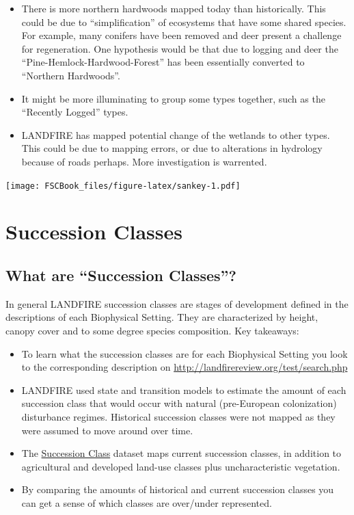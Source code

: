 \documentclass[
]{book}
\providecommand{\tightlist}{%
  \setlength{\itemsep}{0pt}\setlength{\parskip}{0pt}}
\begin{document}
\begin{itemize}
\tightlist
\item
  There is more northern hardwoods mapped today than historically. This could be due to ``simplification'' of ecosystems that have some shared species. For example, many conifers have been removed and deer present a challenge for regeneration. One hypothesis would be that due to logging and deer the ``Pine-Hemlock-Hardwood-Forest'' has been essentially converted to ``Northern Hardwoods''.
\item
  It might be more illuminating to group some types together, such as the ``Recently Logged'' types.
\item
  LANDFIRE has mapped potential change of the wetlands to other types. This could be due to mapping errors, or due to alterations in hydrology because of roads perhaps. More investigation is warrented.
\end{itemize}

\texttt{[image: FSCBook\_files/figure-latex/sankey-1.pdf]}

\hypertarget{successionClasses}{%
\chapter{Succession Classes}\label{successionClasses}}

\hypertarget{what-are-succession-classes}{%
\section{What are ``Succession Classes''?}\label{what-are-succession-classes}}

In general LANDFIRE succession classes are stages of development defined in the descriptions of each Biophysical Setting. They are characterized by height, canopy cover and to some degree species composition. Key takeaways:

\begin{itemize}
\tightlist
\item
  To learn what the succession classes are for each Biophysical Setting you look to the corresponding description on \url{http://landfirereview.org/test/search.php}
\item
  LANDFIRE used state and transition models to estimate the amount of each succession class that would occur with natural (pre-European colonization) disturbance regimes. Historical succession classes were not mapped as they were assumed to move around over time.
\item
  The \href{https://www.landfire.gov/sclass.php}{Succession Class} dataset maps current succession classes, in addition to agricultural and developed land-use classes plus uncharacteristic vegetation.
\item
  By comparing the amounts of historical and current succession classes you can get a sense of which classes are over/under represented.
\end{itemize}
\end{document}
